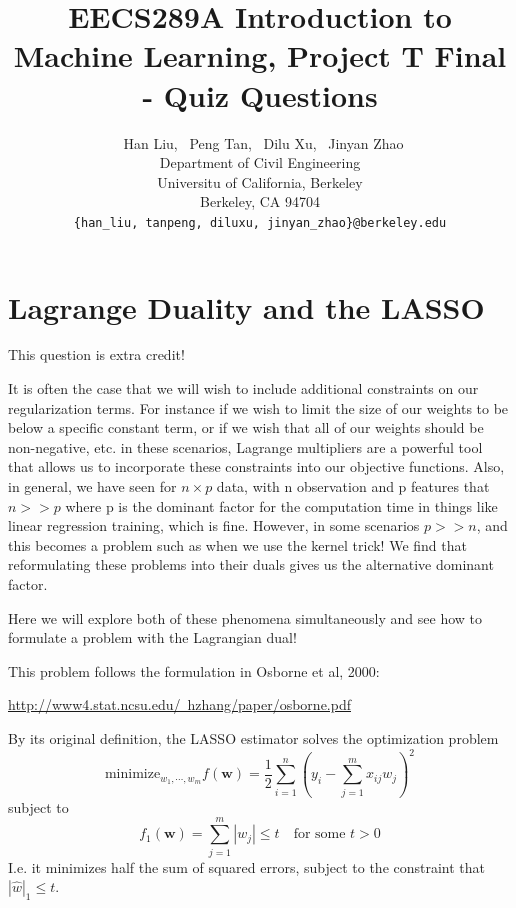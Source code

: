 \documentclass{article}
\renewcommand{\vec}[1]{\boldsymbol{#1}}
\begin{document}
\title{EECS289A Introduction to Machine Learning,  Project T Final - Quiz Questions}
\author{%
  \ Han Liu, \ Peng Tan, \ Dilu Xu, \ Jinyan Zhao \\
  Department of Civil Engineering\\
  Universitu of California, Berkeley\\
  Berkeley, CA 94704 \\
  \texttt{\{han\_liu, tanpeng, diluxu, jinyan\_zhao\}@berkeley.edu} \\
}
\maketitle
\section{Lagrange Duality and the LASSO}
This question is extra credit!

It is often the case that we will wish to include additional constraints on our regularization terms. For instance if we wish to limit the size of our weights to be below a specific constant term, or if we wish that all of our weights should be non-negative, etc. in these scenarios, Lagrange multipliers are a powerful tool
that allows us to incorporate these constraints into our objective functions.
Also, in general, we have seen for $n \times p$ data, with n observation and p features that $n >> p$ where p is the dominant factor for the computation time in things like linear regression training, which is fine. However, in some scenarios $p >> n$, and this becomes a problem such as when we use the kernel trick! We find that reformulating these problems into their duals gives us the alternative dominant factor.

Here we will explore both of these phenomena simultaneously and see how to formulate a problem with the Lagrangian dual!

This problem follows the formulation in Osborne et al, 2000:

\underline{http://www4.stat.ncsu.edu/~hzhang/paper/osborne.pdf}

By its original definition, the LASSO estimator solves the optimization problem
\begin{equation}
\text{minimize}_{w_1,\cdots, w_m}f(\vec{w})=\frac{1}{2}\sum^n_{i=1}(y_i-\sum^m_{j=1}x_{ij}w_j)^2
\end{equation}
subject to 
\begin{equation}
f_1(\vec{w})=\sum^m_{j=1}|w_j|\leq t\quad\text{for some $t>0$}
\end{equation}
I.e. it minimizes half the sum of squared errors, subject to the constraint that $|\hat{w}|_1\leq t$.
\end{document}
